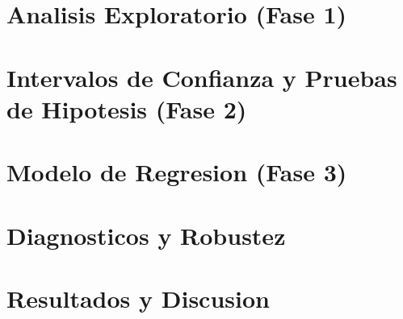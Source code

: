 \documentclass[11pt, a4paper]{article}
\begin{document}
\section{Analisis Exploratorio (Fase 1)}

\section{Intervalos de Confianza y Pruebas de Hipotesis (Fase 2)}

\section{Modelo de Regresion (Fase 3)}

\section{Diagnosticos y Robustez}

\section{Resultados y Discusion}
\end{document}

